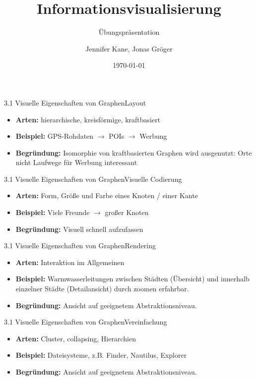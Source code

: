 \documentclass[%
11pt,a4paper,xcolor={usenames,dvipsnames}]{beamer}
\author{Jennifer Kane, Jonas Gröger}
\date{\today}
\begin{document}
    \begin{frame}[plain]
    \title{Informationsvisualisierung}
	\subtitle{Übungspräsentation}
	\titlepage
    \end{frame}

    \begin{frame}{3.1 Visuelle Eigenschaften von Graphen}{Layout}
        \begin{itemize}
            \item \textbf{Arten:} hierarchische, kreisförmige, kraftbasiert
            \item \textbf{Beispiel:} GPS-Rohdaten $\rightarrow$ POIs $\rightarrow$ Werbung
            \item \textbf{Begründung:} Isomorphie von kraftbasierten Graphen wird ausgenutzt: Orte nicht Laufwege für Werbung interessant
        \end{itemize}
    \end{frame}

    \begin{frame}{3.1 Visuelle Eigenschaften von Graphen}{Visuelle Codierung}
        \begin{itemize}
            \item \textbf{Arten:} Form, Größe und Farbe eines Knoten / einer Kante
            \item \textbf{Beispiel:} Viele Freunde $\rightarrow$ großer Knoten
            \item \textbf{Begründung:} Visuell schnell aufzufassen
        \end{itemize}
    \end{frame}

    \begin{frame}{3.1 Visuelle Eigenschaften von Graphen}{Rendering}
        \begin{itemize}
            \item \textbf{Arten:} Interaktion im Allgemeinen
            \item \textbf{Beispiel:} Warmwasserleitungen zwischen Städten (Übersicht) und innerhalb einzelner Städte (Detailansicht) durch zoomen erfahrbar.
            \item \textbf{Begründung:} Ansicht auf geeignetem Abstraktionsniveau.
        \end{itemize}
    \end{frame}

    \begin{frame}{3.1 Visuelle Eigenschaften von Graphen}{Vereinfachung}
        \begin{itemize}
            \item \textbf{Arten:} Cluster, collapsing, Hierarchien
            \item \textbf{Beispiel:} Dateisysteme, z.B. Finder, Nautilus, Explorer
            \item \textbf{Begründung:} Ansicht auf geeignetem Abstraktionsniveau.
        \end{itemize}
    \end{frame}
\end{document}
